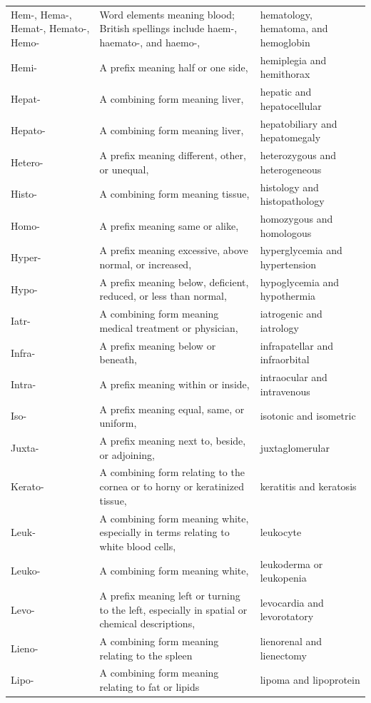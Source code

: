 \begin{longtable}{>{\raggedright\arraybackslash}p{} >{\raggedright\arraybackslash}p{} >{\raggedright\arraybackslash}p{}}
Hem-, Hema-, Hemat-, Hemato-, Hemo- & Word elements meaning blood; British spellings include haem-, haemato-, and haemo-, & hematology, hematoma, and hemoglobin \\
Hemi- & A prefix meaning half or one side, & hemiplegia and hemithorax \\
Hepat- & A combining form meaning liver, & hepatic and hepatocellular \\
Hepato- & A combining form meaning liver, & hepatobiliary and hepatomegaly \\
Hetero- & A prefix meaning different, other, or unequal, & heterozygous and heterogeneous \\
Histo- & A combining form meaning tissue, & histology and histopathology \\
Homo- & A prefix meaning same or alike, & homozygous and homologous \\
Hyper- & A prefix meaning excessive, above normal, or increased, & hyperglycemia and hypertension \\
Hypo- & A prefix meaning below, deficient, reduced, or less than normal, & hypoglycemia and hypothermia \\
Iatr- & A combining form meaning medical treatment or physician, & iatrogenic and iatrology \\
Infra- & A prefix meaning below or beneath, & infrapatellar and infraorbital \\
Intra- & A prefix meaning within or inside, & intraocular and intravenous \\
Iso- & A prefix meaning equal, same, or uniform, & isotonic and isometric \\
Juxta- & A prefix meaning next to, beside, or adjoining, & juxtaglomerular \\
Kerato- & A combining form relating to the cornea or to horny or keratinized tissue, & keratitis and keratosis \\
Leuk- & A combining form meaning white, especially in terms relating to white blood cells, & leukocyte \\
Leuko- & A combining form meaning white, & leukoderma or leukopenia \\
Levo- & A prefix meaning left or turning to the left, especially in spatial or chemical descriptions, & levocardia and levorotatory \\
Lieno- & A combining form meaning relating to the spleen & lienorenal and lienectomy \\
Lipo- & A combining form meaning relating to fat or lipids & lipoma and lipoprotein \\

\end{longtable}
